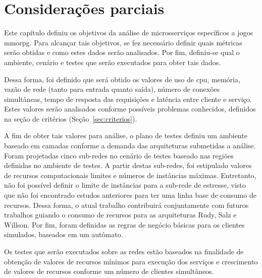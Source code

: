 \section{Considerações parciais}


Este capítulo definiu os objetivos da análise de microsserviços específicos a jogos \ac{mmorpg}.
%
Para alcançar tais objetivos, se fez necessário definir quais métricas serão obtidas e como estes dados serão analisados.
%
Por fim, definiu-se qual o ambiente, cenário e testes que serão executados para obter tais dados.

Dessa forma, foi definido que será obtido os valores de uso de \ac{cpu}, memória, vazão de rede (tanto para entrada quanto saída), número de conexões simultâneas, tempo de resposta das requisições e latência entre cliente e serviço.
%
Estes valores serão analisados conforme possíveis problemas conhecidos, definidos na seção de critérios (Seção~\ref{sec:criterios}).

A fim de obter tais valores para análise, o plano de testes definiu um ambiente baseado em camadas conforme a demanda das arquiteturas submetidas a análise.
%
Foram projetadas cinco sub-redes no cenário de testes baseado nas regiões definidas no ambiente de testes.
%
A partir destas sub-redes, foi estipulado valores de recursos computacionais limites e números de instâncias máximas.
%
Entretanto, não foi possível definir o limite de instâncias para a sub-rede de estresse, visto que não foi encontrado estudos anteriores para ter uma linha base de consumo de recursos.
%
Dessa forma, o atual trabalho contribuirá conjuntamente com futuros trabalhos guiando o consumo de recursos para as arquiteturas Rudy, Salz e Willson.
%
Por fim, foram definidas as regras de negócio básicas para os clientes simulados, baseados em um autômato.

Os testes que serão executados sobre as redes estão baseados na finalidade de obtenção de valores de recursos mínimos para execução dos serviços e crescimento de valores de recursos conforme um número de clientes simultâneos.
